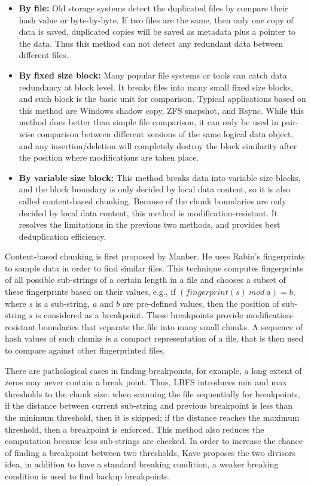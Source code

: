 \begin{itemize}
\item \textbf{By file:} Old storage systems detect the duplicated files by compare their hash value
or byte-by-byte. If two files are the same, then only one copy of data is saved, duplicated
copies will be saved as metadata plus a pointer to the data. Thus this method can not detect any redundant data
between different files.

\item \textbf{By fixed size block:} Many popular file systems or tools can catch data redundancy at block level.
It breaks files into many small fixed size blocks, and such block is the basic unit
for comparison. Typical applications based on this method are Windows shadow copy, ZFS\cite{zfs} snapshot, and Rsync\cite{rsync}.
While this method does better than simple file comparison, it can only be used in pair-wise comparison
between different versions of
the same logical data object, and any insertion/deletion will completely destroy the block similarity after the position
where modifications are taken place.

\item \textbf{By variable size block:} This method breaks data into variable size blocks, and the block boundary
is only decided by local data content, so it is also called content-based chunking.
Because of the chunk boundaries are only decided by local data content,
this method is modification-resistant. It resolves the
limitations in the previous two methods, and provides
best deduplication efficiency.
\end{itemize}

Content-based chunking is first proposed by Manber\cite{similar94}.
He uses Rabin's fingerprints\cite{rabin81, identify00} to sample
data in order to find similar files. This technique computes
fingerprints of all possible sub-strings of a certain
length in a file and chooses a subset of these fingerprints
based on their values,  e.g., if $(fingerprint(s)\ mod\ a) = b$, where
$s$ is a sub-string,
$a$ and $b$ are pre-defined values, then the position of sub-string $s$
is considered as a breakpoint.
These breakpoints provide
modification-resistant boundaries that separate the file
into many small chunks. A sequence of hash values of such chunks
is a compact representation of a file, that is then used to compare
against other fingerprinted files.

There are pathological cases in finding breakpoints, for example,
a long extent of zeros may never contain a break point. Thus, LBFS\cite{lbfs01}
introduces min and max thresholds to the chunk size: when scanning the file
sequentially for breakpoints, if the distance between current sub-string
and previous breakpoint is less than the minimum threshold, then it is skipped;
if the distance reaches the maximum threshold, then a breakpoint
is enforced. This method also reduces the computation because less sub-strings
are checked. In order to increase the chance of finding a breakpoint between
two thresholds, Kave\cite{frame05}
proposes the two divisors idea, in addition to have a standard breaking condition,
a weaker breaking condition is used to find backup breakpoints.

